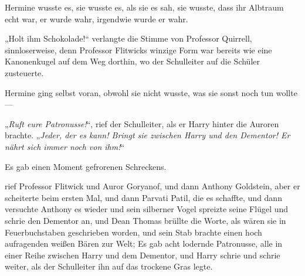 Hermine wusste es, sie wusste es, als sie es sah, sie wusste, dass ihr Albtraum echt war, er wurde wahr, irgendwie wurde er wahr.

„Holt ihm Schokolade!“ verlangte die Stimme von Professor Quirrell, sinnloserweise, denn Professor Flitwicks winzige Form war bereits wie eine Kanonenkugel auf dem Weg dorthin, wo der Schulleiter auf die Schüler zusteuerte.

Hermine ging selbst voran, obwohl sie nicht wusste, was sie sonst noch tun wollte —

„\emph{Ruft eure Patronusse!}“, rief der Schulleiter, als er Harry hinter die Auroren brachte.
„\emph{Jeder, der es kann! Bringt sie zwischen Harry und den Dementor! Er nährt sich immer noch von ihm!}“

Es gab einen Moment gefrorenen Schreckens.

 rief Professor Flitwick und Auror Goryanof, und dann Anthony Goldstein, aber er scheiterte beim ersten Mal, und dann Parvati Patil, die es schaffte, und dann versuchte Anthony es wieder und sein silberner Vogel spreizte seine Flügel und schrie den Dementor an, und Dean Thomas brüllte die Worte, als wären sie in Feuerbuchstaben geschrieben worden, und sein Stab brachte einen hoch aufragenden weißen Bären zur Welt; Es gab acht lodernde Patronusse, alle in einer Reihe zwischen Harry und dem Dementor, und Harry schrie und schrie weiter, als der Schulleiter ihn auf das trockene Gras legte.

